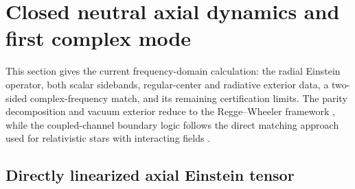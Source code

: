 \section{Closed neutral axial dynamics and first complex mode}
\label{sec:axial-dynamics}

This section gives the current frequency-domain calculation: the radial
Einstein operator, both scalar sidebands, regular-center and radiative exterior
data, a two-sided complex-frequency match, and its remaining certification
limits.  The parity decomposition and
vacuum exterior reduce to the Regge--Wheeler framework \cite{ReggeWheeler1957},
while the coupled-channel boundary logic follows the direct matching approach
used for relativistic stars with interacting fields \cite{Macedo2016}.

\subsection{Directly linearized axial Einstein tensor}


